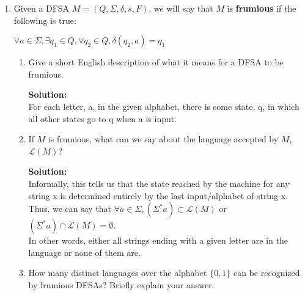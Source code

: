 \documentclass[boldsans]{article}
\newenvironment{solution}
{\bigskip \noindent \textbf{Solution: \\}}
{}
\newcommand{\RE}{\mathcal{RE}}
\newcommand{\REQ}{\mathcal{REQ}}
\renewcommand{\L}{\mathcal{L}}
\begin{document}
\begin{enumerate}
\begin{enumerate}
\begin{solution}
    This means that $R_2$ is either empty or equal to S: $\L(R_2) = \L(T) \cup \L(S) = \L(\epsilon) \cup \L(S)$\\
    As we can see, $R_1$ and $R_2$ define the same Regular Expression and share the same language.\\
    Therefore, I have shown what I want for this case.\\
    \\
    Through structural induction, I have proven that all regular expressions in $\REQ$ can be written as a regular expression in $\RE$.\\
    \end{solution}
\end{enumerate}

\item Given a DFSA $M = (Q, \Sigma, \delta, s, F)$, we will say that $M$ is \textbf{frumious} if the following is true:

$\forall a \in \Sigma, \exists q_1 \in Q, \forall q_2 \in Q, \delta(q_2, a) = q_1$

\begin{enumerate}
    \item Give a short English description of what it means for a DFSA to be frumious.
    
    \begin{solution}
    For each letter, a, in the given alphabet, there is some state, q, in which all other states go to q when a is input.\\
    \end{solution}
    
    \item If $M$ is frumious, what can we say about the language accepted by $M$, $\L(M)$?
    
    \begin{solution}
    Informally, this tells us that the state reached by the machine for any string x is determined entirely by the last input/alphabet of string x.\\
    Thus, we can say that $\forall a \in \Sigma, (\Sigma^* a)\subset \L(M)$ or $(\Sigma^* a) \cap \L(M) = \emptyset$.\\
    In other words, either all strings ending with a given letter are in the language or none of them are.\\
    \end{solution}
    
    \item How many distinct languages over the alphabet $\{0, 1\}$ can be recognized by frumious DFSAs? Briefly explain your answer.
    

\end{enumerate}
\end{enumerate}
\end{document}
